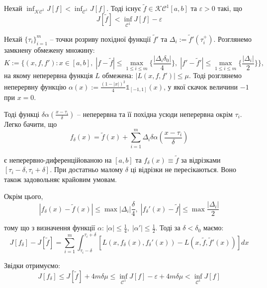 \documentclass[14pt]{extarticle}
\newcommand{\<}{\langle}
\renewcommand{\>}{\rangle}
\theoremstyle{mystyle}{\newtheorem{definition}{Definition}[section]}
\theoremstyle{mystyle}{\newtheorem{proposition}[definition]{Proposition}}
\theoremstyle{mystyle}{\newtheorem{theorem}[definition]{Theorem}}
\theoremstyle{mystyle}{\newtheorem{lemma}[definition]{Lemma}}
\theoremstyle{mystyle}{\newtheorem{corollary}[definition]{Corollary}}
\theoremstyle{mystyle}{\newtheorem*{remark}{Remark}}
\theoremstyle{mystyle}{\newtheorem*{remarks}{Remarks}}
\theoremstyle{mystyle}{\newtheorem*{example}{Example}}
\theoremstyle{mystyle}{\newtheorem*{examples}{Examples}}
\theoremstyle{definition}{\newtheorem*{exercise}{Exercise}}
\theoremstyle{cstyle}{\newtheorem*{cthm}{}}
\theoremstyle{warn}
\begin{document}
Нехай $\inf_{\mathcal{KC}^1}J[f]<\inf_{\mathcal{C}^1}J[f]$. Тоді існує $\widetilde{f} \in \mathcal{KC}^1[a,b]$ та $\varepsilon>0$ такі, що
\begin{equation}
    J[\widetilde{f}] < \inf_{\mathcal{C}^1}J[f] - \varepsilon
\end{equation}

Нехай $\{\tau_i\}_{i=1}^m$ -- точки розриву похідної функції $\widetilde{f}'$ та $\Delta_i := \widetilde{f}'(\tau_i^+)$. Розглянемо замкнену обмежену множину:
\begin{equation}
    K := \{(x,f,f'): x \in [a,b], \; |f-\widetilde{f}| \leq \max_{1\leq i\leq m}\{\frac{|\Delta_i\delta_0|}{4}\}, \; |f'-\widetilde{f}'| \leq \max_{1 \leq i \leq m}\{\frac{|\Delta_i|}{2}\}\},
\end{equation}
на якому неперервна функція $L$ обмежена: $|L(x,f,f')|\leq\mu$. Тоді розглянемо неперервну функцію $\alpha(x):=\frac{(1-|x|)^2}{4}\mathds{1}_{[-1,1]}(x)$, у якої скачок величини $-1$ при $x=0$.

Тоді функці $\delta \alpha\left(\frac{x-\tau_i}{\delta}\right)$ -- неперервна та її похідна усюди неперервна окрім $\tau_i$. Легко бачити, що
\begin{equation}
    f_{\delta}(x) = \widetilde{f}(x) + \sum_{i=1}^m \Delta_i \delta\alpha \left(\frac{x-\tau_i}{\delta}\right)
\end{equation}

є неперервно-диференційованою на $[a,b]$ та $f_{\delta}(x)\equiv \widetilde{f}$ за відрізками $[\tau_i-\delta,\tau_i+\delta]$. При достатньо малому $\delta$ ці відрізки не пересікаються. Воно також задовольняє крайовим умовам. 

Окрім цього,
\begin{equation}
    |f_{\delta}(x)-\widetilde{f}(x)| \leq \max |\Delta_i| \frac{\delta}{4}, \; |f_{\delta}'(x)-\widetilde{f}| \leq \max \frac{|\Delta_i|}{2}
\end{equation}

тому що з визначення функції $\alpha$: $|\alpha| \leq \frac{1}{4}, \; |\alpha'| \leq \frac{1}{2}$. Тоді за $\delta<\delta_0$ маємо:
\begin{equation}
    J[f_{\delta}]-J[\widetilde{f}] = \sum_{i=1}^m\int_{\tau_i-\delta}^{\tau_i+\delta}[L(x,f_{\delta}(x),f_{\delta}'(x))-L(x,\widetilde{f},\widetilde{f}'(x))]dx
\end{equation}

Звідки отримуємо:
\begin{equation}
    J[f_{\delta}] \leq J[\widetilde{f}] + 4m\delta \mu \leq \inf_{\mathcal{C}^1}J[f] - \varepsilon + 4m\delta \mu < \inf_{\mathcal{C}^1}J[f]
\end{equation}
\end{document}
